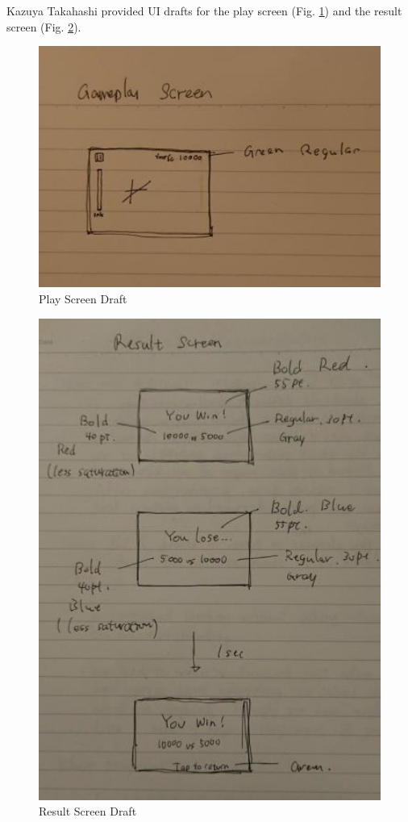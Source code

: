Kazuya Takahashi provided UI drafts for the play screen (Fig. \ref{fig:PlayScreen1}) and the result screen (Fig. \ref{fig:ResultDraft1}).

\begin{figure}[htbp]
	\centering
		\includegraphics[width=1.00\textwidth]{img/PlayScreen1.jpg}
	\caption[Play Screen Draft]{Play Screen Draft}
	\label{fig:PlayScreen1}
\end{figure}

\begin{figure}[htbp]
	\centering
		\includegraphics[width=1.00\textwidth]{img/ResultDraft1.jpg}
	\caption[Result Screen Draft]{Result Screen Draft}
	\label{fig:ResultDraft1}
\end{figure}
 
